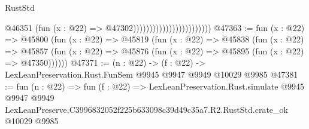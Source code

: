 \begin{lexlean}{RustStd}
\begin{coremodule}
                                                @46351
                                                  (fun (x : @22) => @47302))))))))))))))))))))))))
@47363 := fun (x : @22) =>
  @45800
    (fun (x : @22) =>
    @45819
      (fun (x : @22) =>
      @45838
        (fun (x : @22) =>
        @45857 (fun (x : @22) => @45876 (fun (x : @22) => @45895 (fun (x : @22) => @47350))))))
@47371 := (n : @22) -> (f : @22) -> LexLeanPreservation.Rust.FunSem @9945 @9947 @9949 @10029 @9985
@47381 := fun (n : @22) =>
  fun (f : @22) =>
  LexLeanPreservation.Rust.simulate
    @9945
    @9947
    @9949
    LexLeanPreserve.C3996832052f225b633098c39d49c35a7.R2.RustStd.crate_ok
    @10029
    @9985
\end{coremodule}
\end{lexlean}
